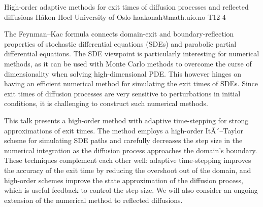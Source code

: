 \begin{talk}
  {High-order adaptive methods for exit times of diffusion processes and reflected diffusions}%
  {H{\aa}kon Hoel}%
  {University of Oslo}%
  {haakonah@math.uio.no}%
  {}%
  {T12-4}%
			
\medskip
The Feynman--Kac formula connects domain-exit and boundary-reflection properties of stochastic differential equations (SDEs) and parabolic partial differential equations. The SDE viewpoint is particularly interesting for numerical methods, as it can be used with Monte Carlo methods to overcome the curse of dimensionality when solving high-dimensional PDE. This however hinges on having an efficient numerical method for simulating the exit times of SDEs. Since exit times of diffusion processes are very sensitive to perturbations in initial conditions, it is challenging to construct such numerical methods.

This talk presents a high-order method with adaptive time-stepping for strong approximations of exit times. The method employs a high-order ItÃ´--Taylor scheme for simulating SDE paths and carefully decreases the step size in the numerical integration as the diffusion process approaches the domain's boundary. These techniques complement each other well: adaptive time-stepping improves the accuracy of the exit time by reducing the overshoot out of the domain, and high-order schemes improve the state approximation of the diffusion process, which is useful feedback to control the step size. We will also consider an ongoing extension of the numerical method to reflected diffusions.

\end{talk}

